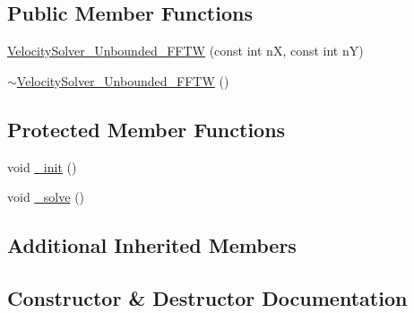 \subsection*{Public Member Functions}
\begin{DoxyCompactItemize}
\item 
\hyperlink{class_velocity_solver___unbounded___f_f_t_w_ad8e42aad70fb3e031e64d109097c5cec}{Velocity\+Solver\+\_\+\+Unbounded\+\_\+\+F\+F\+T\+W} (const int n\+X, const int n\+Y)
\item 
\hyperlink{class_velocity_solver___unbounded___f_f_t_w_a0a5e8585f426b49c9cb189bd28173e6f}{$\sim$\+Velocity\+Solver\+\_\+\+Unbounded\+\_\+\+F\+F\+T\+W} ()
\end{DoxyCompactItemize}
\subsection*{Protected Member Functions}
\begin{DoxyCompactItemize}
\item 
void \hyperlink{class_velocity_solver___unbounded___f_f_t_w_a438430f0e53d259baa46539c2ba5acbc}{\+\_\+init} ()
\item 
void \hyperlink{class_velocity_solver___unbounded___f_f_t_w_abe6acc32fcfbcad312a5cecad3bad332}{\+\_\+solve} ()
\end{DoxyCompactItemize}
\subsection*{Additional Inherited Members}


\subsection{Constructor \& Destructor Documentation}
\hypertarget{class_velocity_solver___unbounded___f_f_t_w_ad8e42aad70fb3e031e64d109097c5cec}{}
